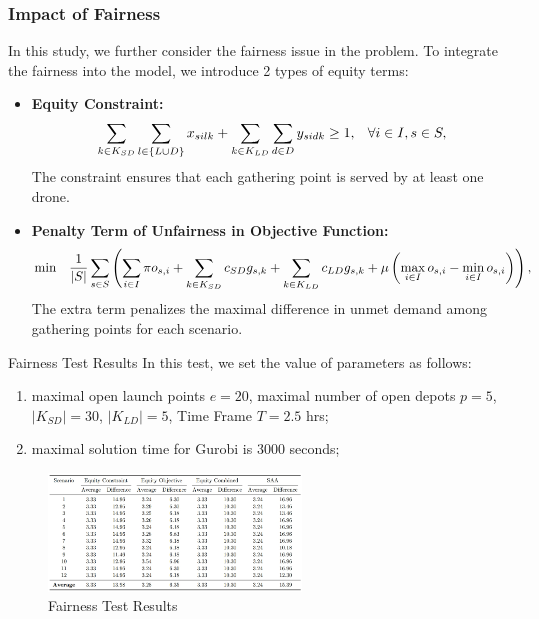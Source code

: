 \documentclass[aspectratio=169]{beamer}
\begin{document}
\begin{frame}\frametitle{Impact of Fairness}
In this study, we further consider the fairness issue in the problem. To integrate the fairness into the model, we introduce 2 types of equity terms:
\begin{itemize}
    \item \textbf{Equity Constraint:} \\    
    \begin{equation}
        \scriptsize
        \sum_{k \in K_{SD}} \sum_{l \in \{L \cup D\}} x_{silk} +  \sum_{k \in K_{LD}} \sum_{d \in D} y_{sidk}\geq 1, \quad \forall i \in I, s \in S,
        \label{eq:fairness_constraint}
    \end{equation}
    The constraint ensures that each gathering point is served by at least one drone.
    \item \textbf{Penalty Term of Unfairness in Objective Function:} \\
    \begin{equation}
    \scriptsize
        \min \quad \frac{1}{|S|} \sum_{s \in S} \left(\sum_{i \in I} \pi o_{s,i} + \sum_{k \in K_{SD}} c_{SD} g_{s,k} + \sum_{k \in K_{LD}} c_{LD} g_{s,k} + \mu \left( \max_{i \in I} o_{s,i} - \min_{i \in I} o_{s,i} \right) \right),
        \label{eq:fairness_objective}
    \end{equation}
    The extra term penalizes the maximal difference in unmet demand among gathering points for each scenario.
\end{itemize}
\end{frame}

\begin{frame}{Fairness Test Results}
In this test, we set the value of parameters as follows:
\begin{enumerate}[label=\arabic*.]
    \item maximal open launch points $e = 20$, maximal number of open depots $p = 5$, $|K_{SD}| = 30$, $|K_{LD}| = 5$, Time Frame $T=2.5$ hrs;
    \item maximal solution time for Gurobi is 3000 seconds;
\end{enumerate}
\begin{figure}
    \centering
    \includegraphics[width=0.6\textwidth]{fig_fairness_test.png}
    \caption{Fairness Test Results}
    \label{fig:fairness_test}
\end{figure}
\end{frame}
\end{document}

